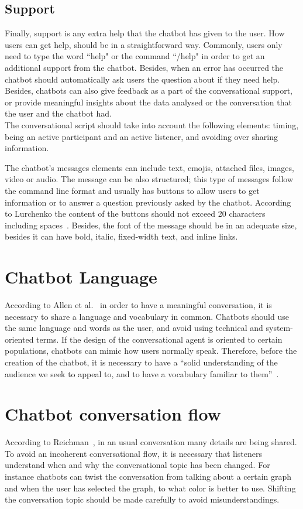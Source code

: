 \documentclass[a4paper,10pt]{article}
\begin{document}
\subsection{Support}
Finally, support is any extra help that the chatbot has given to the user. How users can get help, should be in a straightforward way. Commonly, users only need to type the word ``help" or the command ``/help" in order to get an additional support from the chatbot. Besides, when an error has occurred the chatbot should automatically ask users the question about if they need help. Besides, chatbots can also give feedback as a part of the conversational support, or provide meaningful insights about the data analysed or the conversation that the user and the chatbot had.\\[0\baselineskip]

The conversational script should take into account the following elements: timing, being an active participant and an active listener, and avoiding over sharing information.

The chatbot's messages elements can include text, emojis, attached files, images, video or audio. The message can be also structured; this type of messages follow the command line format and usually has buttons to allow users to get information or to answer a question previously asked by the chatbot. According to Lurchenko the content of the buttons should not exceed 20 characters including spaces~\cite{CheatSheet}. Besides, the font of the message should be in an adequate size, besides it can have bold, italic, fixed-width text, and inline links. 

\section{Chatbot Language}
According to Allen et al.~\cite{allen1978conversation} in order to have a meaningful conversation, it is necessary to share a language and vocabulary in common. Chatbots should use the same language and words as the user, and avoid using technical and system-oriented terms. If the design of the conversational agent is oriented to certain populations, chatbots can mimic how users normally speak.  Therefore, before the creation of the chatbot, it is necessary to have a ``solid understanding of the audience we seek to appeal to, and to have a vocabulary familiar to them”~\cite{HeuristicsWebPage}. 

\section{Chatbot conversation flow}
According to Reichman~\cite{reichman1985getting}, in an usual conversation many details are being shared. To avoid an incoherent conversational flow, it is necessary that listeners understand when and why the conversational topic has been changed. For instance chatbots can twist the conversation from talking about a certain graph and when the user has selected the graph, to what color is better to use. Shifting the conversation topic should be made carefully to avoid misunderstandings. 
\end{document}
